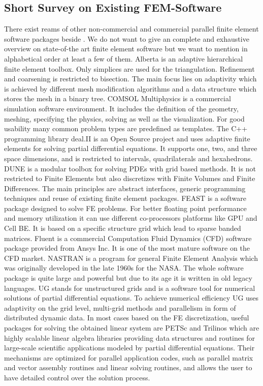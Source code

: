 \subsection{Short Survey on Existing FEM-Software}
There exist reams of other non-commercial and commercial parallel
finite element software packages beside \hiflow{}. We do not want to
give an complete and exhaustive overview on state-of-the art finite
element software but we want to mention in alphabetical order at least a few of them.
Alberta \cite{Alberta} is an adaptive hierarchical finite element
toolbox. Only simplices are used for the triangulation. Refinement and
coarsening is restricted to bisection.  The main focus lies on
adaptivity which is achieved by different mesh modification algorithms
and a data structure which stores the mesh in a binary tree. COMSOL Multiphysics
\cite{COMSOL} is a commercial simulation software
environment. It includes the definition of the geometry, meshing,
specifying the physics, solving as well as the visualization.  For
good usability many common problem types are predefined as templates.
The C++ programming library deal.II \cite{BHK,BHK07} is an Open Source
project and uses adaptive finite elements for solving partial
differential equations. It supports one, two, and three space
dimensions, and is restricted to intervals, quadrilaterals and
hexahedrons. 
DUNE \cite{DUNE} is a modular toolbox for
solving PDEs with grid based methods.  It is not restricted to Finite
Elements but also discretizes with Finite Volumes and Finite
Differences. The main principles are abstract interfaces, generic
programming techniques and reuse of existing finite element packages.
FEAST \cite{FEAST} is a software package designed to solve FE
problems. For better floating point performance and memory utilization
it can use different co-processors platforms like GPU and Cell
BE. It is based on a specific structure grid which lead to sparse
banded matrices.  Fluent \cite{Fluent} is a commercial Computation
Fluid Dynamics (CFD) software package provided from Ansys Inc. It is
one of the most mature software on the CFD market. NASTRAN is a program for general
Finite Element Analysis which was originally developed in the late
1960s for the NASA. The whole software package is quite large and
powerful but due to its age it is written in old legacy
languages. UG \cite{UG} stands for unstructured grids and is a software tool for
numerical solutions of partial differential equations. To achieve
numerical efficiency UG uses adaptivity on the grid level, multi-grid
methods and parallelism in form of distributed dynamic data. In most
cases based on the FE discretization, useful packages for solving the
obtained linear system are PETSc
\cite{petsc-user-ref,petsc-web-page,petsc-efficient} and Trilinos \cite{Trilinos}
which are highly
scalable linear algebra libraries providing data structures and routines
for large-scale scientific applications modeled by partial
differential equations. Their mechanisms are optimized for parallel
application codes, such as parallel matrix and vector assembly
routines and linear solving routines, and allows the user to have
detailed control over the solution process.
